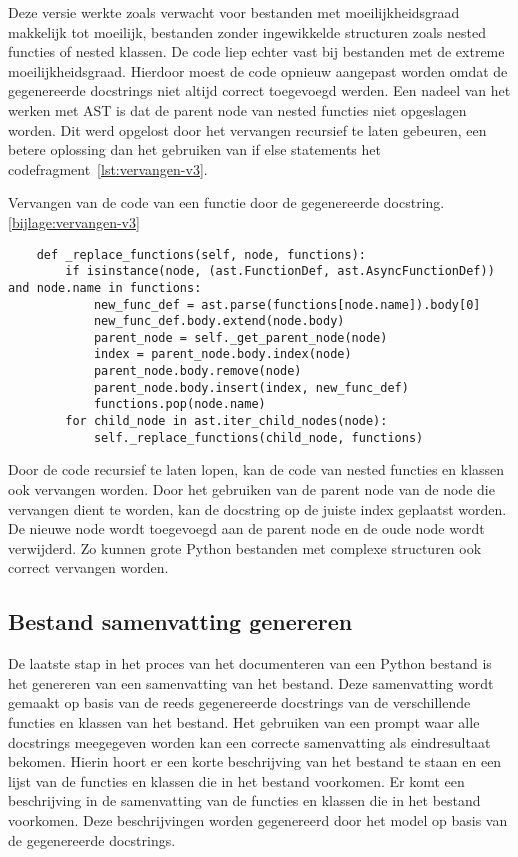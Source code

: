 Deze versie werkte zoals verwacht voor bestanden met moeilijkheidsgraad makkelijk tot moeilijk, bestanden zonder ingewikkelde structuren zoals nested functies of nested klassen.
De code liep echter vast bij bestanden met de extreme moeilijkheidsgraad.
Hierdoor moest de code opnieuw aangepast worden omdat de gegenereerde docstrings niet altijd correct toegevoegd werden.
Een nadeel van het werken met AST is dat de parent node van nested functies niet opgeslagen worden.
Dit werd opgelost door het vervangen recursief te laten gebeuren, een betere oplossing dan het gebruiken van if else statements het codefragment~\ref{lst:vervangen-v3}.

\begin{listing}
    \caption[Code voor het vervangen van een docstring v2]{Vervangen van de code van een functie door de gegenereerde docstring. \ref{bijlage:vervangen-v3}}
    \label{lst:vervangen-v3}
    \begin{verbatim}
    def _replace_functions(self, node, functions):
        if isinstance(node, (ast.FunctionDef, ast.AsyncFunctionDef)) and node.name in functions:
            new_func_def = ast.parse(functions[node.name]).body[0]
            new_func_def.body.extend(node.body)
            parent_node = self._get_parent_node(node)
            index = parent_node.body.index(node)
            parent_node.body.remove(node)
            parent_node.body.insert(index, new_func_def)
            functions.pop(node.name)
        for child_node in ast.iter_child_nodes(node):
            self._replace_functions(child_node, functions)
    \end{verbatim}
\end{listing}

Door de code recursief te laten lopen, kan de code van nested functies en klassen ook vervangen worden.
Door het gebruiken van de parent node van de node die vervangen dient te worden, kan de docstring op de juiste index geplaatst worden.
De nieuwe node wordt toegevoegd aan de parent node en de oude node wordt verwijderd.
Zo kunnen grote Python bestanden met complexe structuren ook correct vervangen worden.

\subsection{Bestand samenvatting genereren}
\label{sec:bestanddocumentatie-samenvatting}
De laatste stap in het proces van het documenteren van een Python bestand is het genereren van een samenvatting van het bestand.
Deze samenvatting wordt gemaakt op basis van de reeds gegenereerde docstrings van de verschillende functies en klassen van het bestand.
Het gebruiken van een prompt waar alle docstrings meegegeven worden kan een correcte samenvatting als eindresultaat bekomen.
Hierin hoort er een korte beschrijving van het bestand te staan en een lijst van de functies en klassen die in het bestand voorkomen.
Er komt een beschrijving in de samenvatting van de functies en klassen die in het bestand voorkomen.
Deze beschrijvingen worden gegenereerd door het model op basis van de gegenereerde docstrings.

